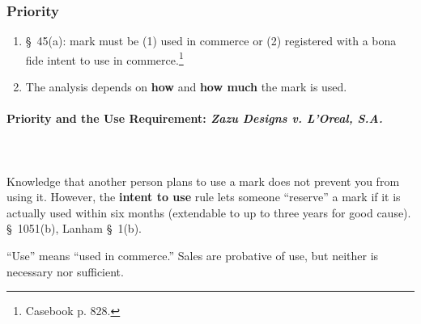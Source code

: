 \subsubsection{Priority}

\begin{enumerate}
    \item \S\ 45(a): mark must be (1) used in commerce or (2) registered with 
    a bona fide intent to use in commerce.\footnote{Casebook p. 828.}
    \item The analysis depends on \textbf{how} and \textbf{how much} the mark 
    is used.
\end{enumerate}

\paragraph{Priority and the Use Requirement: \emph{Zazu Designs v. L'Oreal, 
S.A.}}
~\\\\
Knowledge that another person plans to use a mark does not prevent you from 
using it. However, the \textbf{intent to use} rule lets someone ``reserve'' a 
mark if it is actually used within six months (extendable to up to three years 
for good cause). \S\ 1051(b), Lanham \S\ 1(b).

``Use'' means ``used in commerce.'' Sales are probative of use, but neither is 
necessary nor sufficient.

